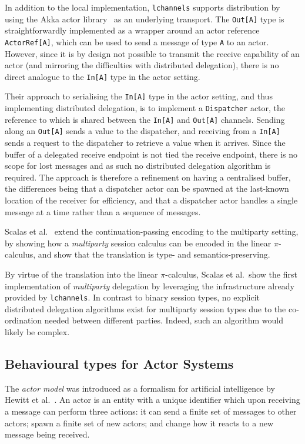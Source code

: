 \documentclass[
graybox,
envcountchap
]{svmult}
\begin{document}
\begin{bibunit}
  In addition to the local implementation, \texttt{lchannels} supports distribution
  by using the Akka actor library~\cite{akka} as an underlying transport.
  The \verb+Out[A]+ type is straightforwardly implemented as a wrapper around an
  actor reference \verb+ActorRef[A]+, which can be used to send a message of
  type \verb+A+ to an actor. However, since it is by design not possible to
  transmit the receive capability of an actor (and mirroring the difficulties
  with distributed delegation), there is no direct analogue to the \verb+In[A]+
  type in the actor setting.

  Their approach to serialising the \verb+In[A]+ type in the actor setting, and
  thus implementing distributed delegation, is to implement a \verb+Dispatcher+
  actor, the reference to which is shared between the \verb+In[A]+ and
  \verb+Out[A]+ channels. Sending along an \verb+Out[A]+ sends a value to the
  dispatcher, and receiving from a \verb+In[A]+ sends a request to the
  dispatcher to retrieve a value when it arrives. Since the buffer of a delegated
  receive endpoint is not tied the receive endpoint, there is no scope for
  lost messages and as such no distributed delegation algorithm is required.
  The approach is therefore a refinement on having a centralised buffer, the
  differences being that a dispatcher actor can be spawned at the last-known
  location of the receiver for efficiency, and that a dispatcher actor handles a
  single message at a time rather than a sequence of messages.

  Scalas et al.~\cite{ScalasDHY17:mpst-decomposition} extend the
  continuation-passing encoding to the multiparty setting, by showing how a
  \emph{multiparty} session calculus can be encoded in the linear
  $\pi$-calculus, and show that the translation is type- and
  semantics-preserving.

  By virtue of the translation into the linear $\pi$-calculus, Scalas et al.\
  show the first implementation of \emph{multiparty} delegation by leveraging
  the infrastructure already provided by \texttt{lchannels}. In contrast to
  binary session types, no explicit distributed delegation algorithms exist for
  multiparty session types due to the co-ordination needed between different
  parties. Indeed, such an algorithm would likely be complex.

  \subsection{Behavioural types for Actor Systems}\label{sec:bt:actor-types}
  The \emph{actor model} was introduced as a formalism for artificial
  intelligence by Hewitt et al.~\cite{HewittBS73:actors}. An actor is an entity with a
  unique identifier which upon receiving a message can perform
  three actions: it can send a finite set of messages to other actors; spawn a
  finite set of new actors; and change how it reacts to a new message being
  received.


\end{bibunit}
\end{document}
